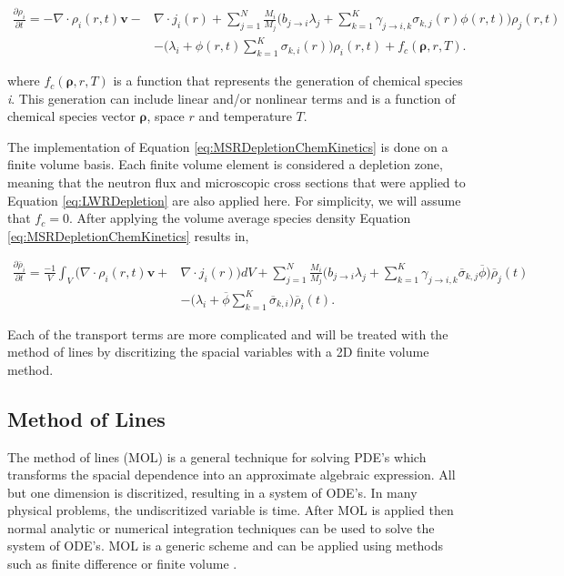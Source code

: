 \begin{equation}
\begin{split}
    \frac{\partial \rho_{i}}{\partial t}
    = -\nabla \cdot \rho_{i}(r,t)\boldsymbol{v}
    - &\nabla \cdot j_{i}(r)
    +
    \sum_{j=1}^{N}\frac{M_{i}}{M_{j}}\bigg(b_{j\rightarrow i}\lambda_{j} + 
    \sum_{k=1}^{K}\gamma_{j\rightarrow i,k}\sigma_{k,j}(r)\phi(r,t) \bigg)\rho_{j}(r,t)\\
    &- \bigg(\lambda_{i} + \phi(r,t)\sum_{k=1}^{K} \sigma_{k,i}(r)\bigg)\rho_{i}(r,t) +  f_{c}(\boldsymbol{\rho}, r, T).
\end{split}
    \label{eq:MSRDepletionChemKinetics}
\end{equation}

\noindent where $f_{c}(\boldsymbol{\rho}, r, T)$ is a function that represents the generation of chemical species \textit{i}. This generation can include linear and/or nonlinear terms and is a function of chemical species vector $\boldsymbol{\rho}$, space $r$ and temperature $T$. 

The implementation of Equation \ref{eq:MSRDepletionChemKinetics} is done on a finite volume basis. Each finite volume element is considered a depletion zone, meaning that the neutron flux and microscopic cross sections that were applied to Equation \ref{eq:LWRDepletion} are also applied here. For simplicity, we will assume that $f_{c} = 0$. After applying the volume average species density Equation \ref{eq:MSRDepletionChemKinetics} results in,

\begin{equation}
\begin{split}
    \frac{\partial \overline{\rho}_{i}}{\partial t}
    = \frac{-1}{V}\int_{V}\bigg(\nabla \cdot \rho_{i}(r,t)\boldsymbol{v}
    + &\nabla \cdot j_{i}(r)\bigg)dV
    +
    \sum_{j=1}^{N}\frac{M_{i}}{M_{j}}\bigg(b_{j\rightarrow i}\lambda_{j} + 
    \sum_{k=1}^{K}\gamma_{j\rightarrow i,k}\overline{\sigma}_{k,j}\overline{\phi} \bigg)\overline{\rho}_{j}(t)\\
    &- \bigg(\lambda_{i} + \overline{\phi}\sum_{k=1}^{K} \overline{\sigma}_{k,i}\bigg)\overline{\rho}_{i}(t).
\end{split}
\end{equation}

\noindent Each of the transport terms are more complicated and will be treated with the method of lines by discritizing the spacial variables with a 2D finite volume method.


\subsection{Method of Lines}
The method of lines (MOL) is a general technique for solving PDE's which transforms the spacial dependence into an approximate algebraic expression. All but one dimension is discritized, resulting in a system of ODE's. In many physical problems, the undiscritized variable is time. After MOL is applied then normal analytic or numerical integration techniques can be used to solve the system of ODE's. MOL is a generic scheme and can be applied using methods such as finite difference or finite volume \cite{hamdi2007}. 

